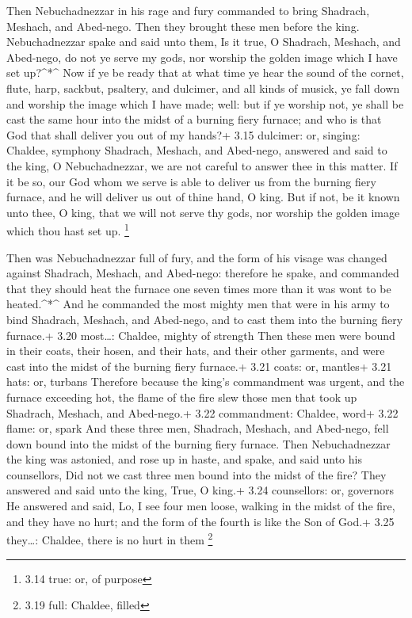  Then Nebuchadnezzar in his rage and fury commanded to
bring Shadrach, Meshach, and Abed-nego. Then they brought these men
before the king.  Nebuchadnezzar spake and said unto them,
Is it true, O Shadrach, Meshach, and Abed-nego, do not ye serve my gods,
nor worship the golden image which I have set up?\^{}*\^{} 
Now if ye be ready that at what time ye hear the sound of the cornet,
flute, harp, sackbut, psaltery, and dulcimer, and all kinds of musick,
ye fall down and worship the image which I have made; well: but if ye
worship not, ye shall be cast the same hour into the midst of a burning
fiery furnace; and who is that God that shall deliver you out of my
hands?+ 3.15 dulcimer: or, singing: Chaldee, symphony 
Shadrach, Meshach, and Abed-nego, answered and said to the king, O
Nebuchadnezzar, we are not careful to answer thee in this matter.
 If it be so, our God whom we serve is able to deliver us
from the burning fiery furnace, and he will deliver us out of thine
hand, O king.  But if not, be it known unto thee, O king,
that we will not serve thy gods, nor worship the golden image which thou
hast set up. \footnote{3.14 true: or, of purpose}

 Then was Nebuchadnezzar full of fury, and the form of his
visage was changed against Shadrach, Meshach, and Abed-nego: therefore
he spake, and commanded that they should heat the furnace one seven
times more than it was wont to be heated.\^{}*\^{}  And he
commanded the most mighty men that were in his army to bind Shadrach,
Meshach, and Abed-nego, and to cast them into the burning fiery
furnace.+ 3.20 most\ldots: Chaldee, mighty of strength 
Then these men were bound in their coats, their hosen, and their hats,
and their other garments, and were cast into the midst of the burning
fiery furnace.+ 3.21 coats: or, mantles+ 3.21 hats: or, turbans
 Therefore because the king's commandment was urgent, and
the furnace exceeding hot, the flame of the fire slew those men that
took up Shadrach, Meshach, and Abed-nego.+ 3.22 commandment: Chaldee,
word+ 3.22 flame: or, spark  And these three men, Shadrach,
Meshach, and Abed-nego, fell down bound into the midst of the burning
fiery furnace.  Then Nebuchadnezzar the king was astonied,
and rose up in haste, and spake, and said unto his counsellors, Did not
we cast three men bound into the midst of the fire? They answered and
said unto the king, True, O king.+ 3.24 counsellors: or, governors
 He answered and said, Lo, I see four men loose, walking in
the midst of the fire, and they have no hurt; and the form of the fourth
is like the Son of God.+ 3.25 they\ldots: Chaldee, there is no hurt in
them \footnote{3.19 full: Chaldee, filled}

